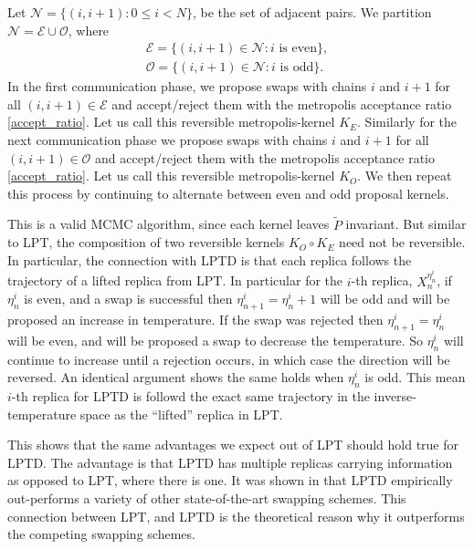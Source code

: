 Let $\mathcal{N}=\{(i,i+1):0\leq i<N\}$, be the set of adjacent pairs. We partition $\mathcal{N}=\mathcal{E}\cup\mathcal{O}$, where
\begin{align*}
\mathcal{E}=\{(i,i+1)\in \mathcal{N}: i \text{ is even}\},\\
\mathcal{O}=\{(i,i+1)\in \mathcal{N}: i \text{ is odd}\}.
\end{align*}
In the first communication phase, we propose swaps with chains $i$ and $i+1$ for all $(i,i+1)\in\mathcal{E}$ and accept/reject them with the metropolis acceptance ratio \eqref{accept_ratio}. Let us call this reversible metropolis-kernel $K_E$. Similarly for the next communication phase we propose swaps with chains $i$ and $i+1$ for all $(i,i+1)\in\mathcal{O}$ and accept/reject them with the metropolis acceptance ratio \eqref{accept_ratio}. Let us call this reversible metropolis-kernel $K_O$. We then repeat this process by continuing to alternate between even and odd proposal kernels. 

This is a valid MCMC algorithm, since each kernel leaves $\tilde{P}$ invariant. But similar to LPT, the composition of two reversible kernels $K_O\circ K_E$ need not be reversible. In particular, the connection with LPTD is that each replica follows the trajectory of a lifted replica from LPT. In particular for the $i$-th replica, $X_n^{\eta^i_n}$, if $\eta_n^i$ is even, and a swap is successful then $\eta^i_{n+1}=\eta_n^i+1$ will be odd and will be proposed an increase in temperature. If the swap was rejected then $\eta_{n+1}^i=\eta_n^i$ will be even, and will be proposed a swap to decrease the temperature. So $\eta_n^i$ will continue to increase until a rejection occurs, in which case the direction will be reversed. An identical argument shows the same holds when $\eta_n^i$ is odd. This mean $i$-th replica for LPTD is followd the exact same trajectory in the inverse-temperature space as the ``lifted'' replica in LPT.

This shows that the same advantages we expect out of LPT should hold true for LPTD. The advantage is that LPTD has multiple replicas carrying information as opposed to LPT, where there is one. It was shown in \cite{lingenheil2009efficiency} that LPTD empirically out-performs a variety of other state-of-the-art swapping schemes. This connection between LPT, and LPTD is the theoretical reason why it outperforms the competing swapping schemes.
